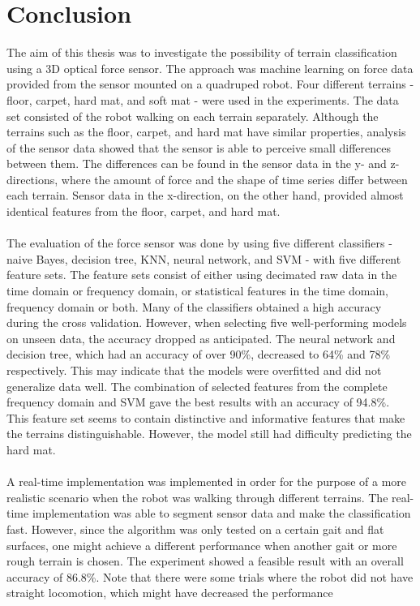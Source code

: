 \documentclass[USenglish]{ifimaster}  %
\begin{document}
\section{Conclusion}
The aim of this thesis was to investigate the possibility of terrain classification using a 3D optical force sensor. The approach was machine learning on force data provided from the sensor mounted on a quadruped robot. Four different terrains - floor, carpet, hard mat, and soft mat - were used in the experiments. The data set consisted of the robot walking on each terrain separately. Although the terrains such as the floor, carpet, and hard mat have similar properties, analysis of the sensor data showed that the sensor is able to perceive small differences between them. The differences can be found in the sensor data in the y- and z-directions, where the amount of force and the shape of time series differ between each terrain. Sensor data in the x-direction, on the other hand, provided almost identical features from the floor, carpet, and hard mat.
\\
\\
The evaluation of the force sensor was done by using five different classifiers - naive Bayes, decision tree, KNN, neural network, and SVM - with five different feature sets. The feature sets consist of either using decimated raw data in the time domain or frequency domain, or statistical features in the time domain, frequency domain or both. Many of the classifiers obtained a high accuracy during the cross validation. However, when selecting five well-performing models on unseen data, the accuracy dropped as anticipated. The neural network and decision tree, which had an accuracy of over 90\%, decreased to 64\% and 78\% respectively. This may indicate that the models were overfitted and did not generalize data well. The combination of selected features from the complete frequency domain and SVM gave the best results with an accuracy of 94.8\%. This feature set seems to contain distinctive and informative features that make the terrains distinguishable. However, the model still had difficulty predicting the hard mat. 
\\
\\
A real-time implementation was implemented in order for the purpose of a more realistic scenario when the robot was walking through different terrains. The real-time implementation was able to segment sensor data and make the classification fast. However, since the algorithm was only tested on a certain gait and flat surfaces, one might achieve a different performance when another gait or more rough terrain is chosen. The experiment showed a feasible result with an overall accuracy of 86.8\%. Note that there were some trials where the robot did not have straight locomotion, which might have decreased the performance
\end{document}
